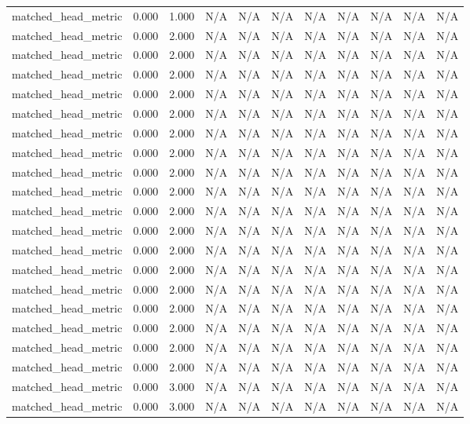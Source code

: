 \begin{table}[h!]
\begin{tabular}{lrrrrrrrrrr}
matched\_head\_metric & 0.000 & 1.000 & N/A & N/A & N/A & N/A & N/A & N/A & N/A & N/A \\
matched\_head\_metric & 0.000 & 2.000 & N/A & N/A & N/A & N/A & N/A & N/A & N/A & N/A \\
matched\_head\_metric & 0.000 & 2.000 & N/A & N/A & N/A & N/A & N/A & N/A & N/A & N/A \\
matched\_head\_metric & 0.000 & 2.000 & N/A & N/A & N/A & N/A & N/A & N/A & N/A & N/A \\
matched\_head\_metric & 0.000 & 2.000 & N/A & N/A & N/A & N/A & N/A & N/A & N/A & N/A \\
matched\_head\_metric & 0.000 & 2.000 & N/A & N/A & N/A & N/A & N/A & N/A & N/A & N/A \\
matched\_head\_metric & 0.000 & 2.000 & N/A & N/A & N/A & N/A & N/A & N/A & N/A & N/A \\
matched\_head\_metric & 0.000 & 2.000 & N/A & N/A & N/A & N/A & N/A & N/A & N/A & N/A \\
matched\_head\_metric & 0.000 & 2.000 & N/A & N/A & N/A & N/A & N/A & N/A & N/A & N/A \\
matched\_head\_metric & 0.000 & 2.000 & N/A & N/A & N/A & N/A & N/A & N/A & N/A & N/A \\
matched\_head\_metric & 0.000 & 2.000 & N/A & N/A & N/A & N/A & N/A & N/A & N/A & N/A \\
matched\_head\_metric & 0.000 & 2.000 & N/A & N/A & N/A & N/A & N/A & N/A & N/A & N/A \\
matched\_head\_metric & 0.000 & 2.000 & N/A & N/A & N/A & N/A & N/A & N/A & N/A & N/A \\
matched\_head\_metric & 0.000 & 2.000 & N/A & N/A & N/A & N/A & N/A & N/A & N/A & N/A \\
matched\_head\_metric & 0.000 & 2.000 & N/A & N/A & N/A & N/A & N/A & N/A & N/A & N/A \\
matched\_head\_metric & 0.000 & 2.000 & N/A & N/A & N/A & N/A & N/A & N/A & N/A & N/A \\
matched\_head\_metric & 0.000 & 2.000 & N/A & N/A & N/A & N/A & N/A & N/A & N/A & N/A \\
matched\_head\_metric & 0.000 & 2.000 & N/A & N/A & N/A & N/A & N/A & N/A & N/A & N/A \\
matched\_head\_metric & 0.000 & 2.000 & N/A & N/A & N/A & N/A & N/A & N/A & N/A & N/A \\
matched\_head\_metric & 0.000 & 3.000 & N/A & N/A & N/A & N/A & N/A & N/A & N/A & N/A \\
matched\_head\_metric & 0.000 & 3.000 & N/A & N/A & N/A & N/A & N/A & N/A & N/A & N/A \\

\end{tabular}
\end{table}
